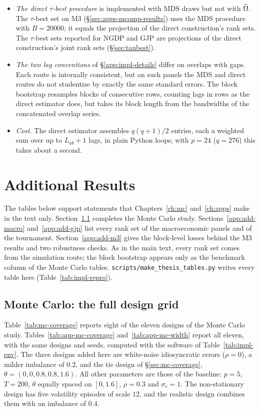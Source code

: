 \begin{appendix}
\begin{itemize}[leftmargin=*]
  \item \emph{The direct $\tau$-best procedure} is implemented with MDS draws but not
    with $\widehat{\Omega}$. The $\tau$-best set on M3 (\S\ref{sec:apps-mcomp-results}) uses
    the MDS procedure with $B=20000$; it equals the projection of the direct
    construction's rank sets. The $\tau$-best sets reported for NGDP and GJP are
    projections of the direct construction's joint rank sets (\S\ref{sec:taubest}).
  \item \emph{The two lag conventions} of \S\ref{app:impl-details} differ on overlaps
    with gaps. Each route is internally consistent, but on such panels the MDS and
    direct routes do not studentize by exactly the same standard errors. The block
    bootstrap resamples blocks of consecutive rows, counting lags in rows as the direct
    estimator does, but takes its block length from the bandwidths of the concatenated
    overlap series.
  \item \emph{Cost.} The direct estimator assembles $q(q+1)/2$ entries, each a
    weighted sum over up to $L_{ab}+1$ lags, in plain Python loops; with $p=24$
    ($q=276$) this takes about a second.
\end{itemize}

\chapter{Additional Results}
\label{app:additional}

The tables below support statements that Chapters~\ref{ch:mc} and~\ref{ch:apps} make
in the text only. Section~\ref{app:add-mc} completes the Monte Carlo study.
Sections~\ref{app:add-macro} and~\ref{app:add-gjp} list every rank set of the
macroeconomic panels and of the tournament. Section~\ref{app:add-m3} gives the
block-level losses behind the M3 results and two robustness checks. As in the main
text, every rank set comes from the simulation route; the block bootstrap appears only
as the benchmark column of the Monte Carlo tables. \texttt{scripts/make\_thesis\_tables.py}
writes every table here (Table~\ref{tab:impl-repro}).

\section{Monte Carlo: the full design grid}
\label{app:add-mc}

Table~\ref{tab:mc-coverage} reports eight of the eleven designs of the Monte Carlo study.
Tables~\ref{tab:app-mc-coverage} and~\ref{tab:app-mc-width} report all eleven, with the
same designs and seeds, computed with the software of Table~\ref{tab:impl-env}. The three
designs added here are white-noise idiosyncratic errors ($\rho=0$), a milder imbalance
of $0.2$, and the tie design of \S\ref{sec:mc-coverage}, $\theta=(0,0,0.8,0.8,1.6)$. All
other parameters are those of the baseline: $p=5$, $T=200$, $\theta$ equally spaced on
$[0,1.6]$, $\rho=0.3$ and $\sigma_c=1$. The non-stationary design has five volatility
episodes of scale $12$, and the realistic design combines them with an imbalance of
$0.4$.


\end{appendix}

